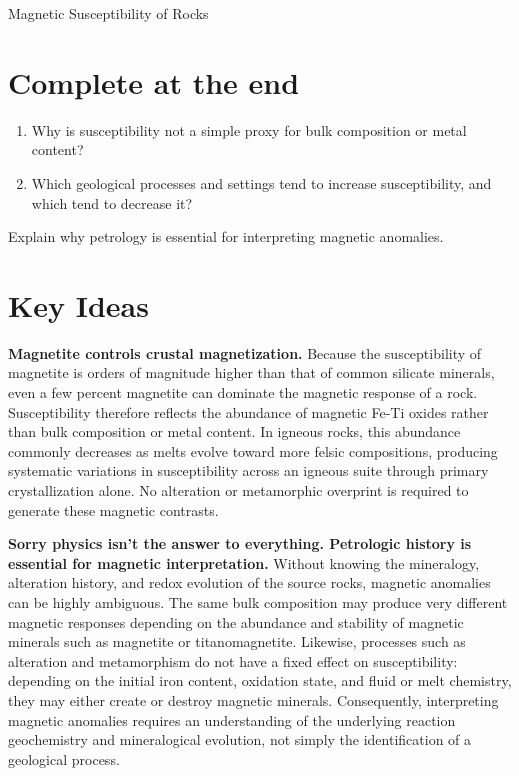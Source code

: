 \begin{activity}{Magnetic Susceptibility of Rocks}
\section*{Complete at the end}

\begin{questions}[resume]
  \begin{enumerate}
    \item Why is susceptibility not a simple proxy for bulk composition or metal content?
    \answerbox[2cm]

    \item Which geological processes and settings tend to increase susceptibility, and which tend to decrease it?
    \answerbox[2cm]
  \end{enumerate}

  Explain why petrology is essential for interpreting magnetic anomalies.
  \answerbox[3cm]
\end{questions}

\section*{Key Ideas}

\textbf{Magnetite controls crustal magnetization.} Because the susceptibility of magnetite is orders of magnitude higher than that of common silicate minerals, even a few percent magnetite can dominate the magnetic response of a rock. Susceptibility therefore reflects the abundance of magnetic Fe-Ti oxides rather than bulk composition or metal content. In igneous rocks, this abundance commonly decreases as melts evolve toward more felsic compositions, producing systematic variations in susceptibility across an igneous suite through primary crystallization alone. No alteration or metamorphic overprint is required to generate these magnetic contrasts.

\textbf{Sorry physics isn't the answer to everything.  Petrologic history is essential for magnetic interpretation.} Without knowing the mineralogy, alteration history, and redox evolution of the source rocks, magnetic anomalies can be highly ambiguous. The same bulk composition may produce very different magnetic responses depending on the abundance and stability of magnetic minerals such as magnetite or titanomagnetite. Likewise, processes such as alteration and metamorphism do not have a fixed effect on susceptibility: depending on the initial iron content, oxidation state, and fluid or melt chemistry, they may either create or destroy magnetic minerals. Consequently, interpreting magnetic anomalies requires an understanding of the underlying reaction geochemistry and mineralogical evolution, not simply the identification of a geological process.

\end{activity}